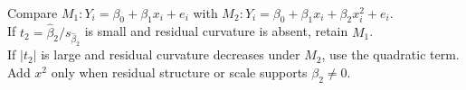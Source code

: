 \begin{example} \label{ex:quadratic-term-as-regression-check} \\
Compare $M_1:Y_i=\beta_0+\beta_1x_i+e_i$ with $M_2:Y_i=\beta_0+\beta_1x_i+\beta_2x_i^2+e_i$.\\
If $t_2=\widehat{\beta}_2/s_{\widehat{\beta}_2}$ is small and residual curvature is absent, retain $M_1$.\\
If $|t_2|$ is large and residual curvature decreases under $M_2$, use the quadratic term.\\
Add $x^2$ only when residual structure or scale supports $\beta_2\neq0$.
\end{example}
